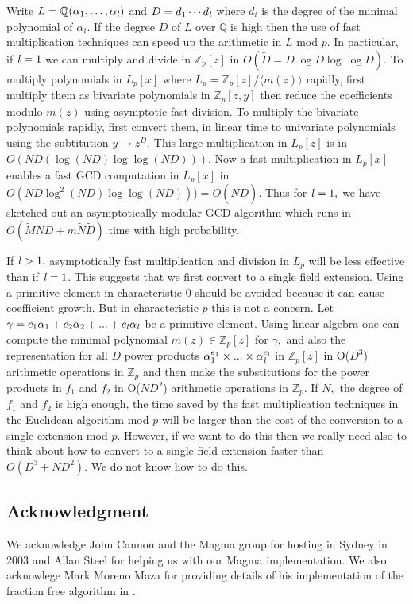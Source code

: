 \documentclass[10pt]{article}
\newcommand{\ls}{{\it l}} \newcommand{\ZZ}{{\mathbb Z}} \newcommand{\QQ}{{\mathbb Q}} \newcommand{\NN}{{\mathbb N}} \newcommand{\FF}{{\mathbb F}} \newcommand{\Zmod}[1]{{\mathbb Z}/(#1)} \newcommand{\divides}{\mid}
\begin{document}
Write $L = \QQ(\alpha_1,\ldots,\alpha_\ls)$ and $D = d_1 \cdots d_\ls$
where $d_i$ is the degree of the minimal polynomial of $\alpha_i$.
If the degree $D$ of $L$ over $\QQ$ is high then the use of fast
multiplication techniques can speed up the arithmetic in $L$ mod $p$.
In particular, if $\ls=1$ we can multiply and divide
in $\ZZ_p[z]$ in $O( \tilde D = D \log D \log \log D).$
To multiply polynomials in $L_p[x]$ where $L_p = \ZZ_p[z]/\langle m(z) \rangle$
rapidly, first multiply them as bivariate polynomials in $\ZZ_p[z,y]$ then reduce
the coefficients modulo $m(z)$ using asymptotic fast division.
To multiply the bivariate polynomials rapidly, first convert them, in linear
time to univariate polynomials using the subtitution $y \rightarrow z^D$.
This large multiplication in $L_p[z]$ is in $O( N D ( \log (ND) \log \log (ND) ) )$.
Now a fast multiplication in $L_p[x]$ enables a fast GCD computation
in $L_p[x]$ in $O( N D \log^2 (ND) \log \log (ND) ) ) = O(\tilde{N} \tilde{D})$.
Thus for $\ls=1,$ we have sketched out an asymptotically modular GCD
algorithm which runs in $O( \tilde{M} N D + m \tilde{N} \tilde{D} )$ time
with high probability.

If $\ls>1,$ asymptotically fast multiplication and division in $L_p$ will
be less effective than if $\ls=1$.  This suggests that we first convert
to a single field extension.  Using a primitive element in characteristic 0
should be avoided because it can cause coefficient growth.
But in characteristic $p$ this is not a concern.
Let $\gamma = c_1 \alpha_1 + c_2 \alpha_2 + ... + c_\ls \alpha_\ls$
be a primitive element.  Using linear algebra one can compute the
minimal polynomial $m(z) \in \ZZ_p[z]$ for $\gamma,$ and also the
representation for all $D$ power products $\alpha_1^{e_1} \times ... \times \alpha_\ls^{e_\ls}$
in $\ZZ_p[z]$ in O($D^3$) arithmetic operations in $\ZZ_p$
and then make the substitutions for the power products in $f_1$
and $f_2$ in O($N D^2$) arithmetic operations in $\ZZ_p$.
If $N,$ the degree of $f_1$ and $f_2$ is high enough, the
time saved by the fast multiplication techniques in the Euclidean
algorithm mod $p$ will be larger than the cost of the
conversion to a single extension mod $p$.
However, if we want to do this then we really need also
to think about how to convert to a single field extension faster
than $O( D^3 + N D^2 ).$  We do not know how to do this.
 
\subsection*{Acknowledgment}
We acknowledge John Cannon and the Magma group for hosting
in Sydney in 2003 and Allan Steel for helping
us with our Magma implementation.
We also acknowlege Mark Moreno Maza for providing details of his implementation
of the fraction free algorithm in \cite{Maza}.
\end{document}
